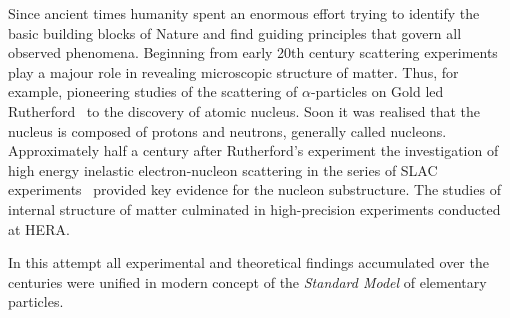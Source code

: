 Since ancient times humanity spent an enormous effort trying to identify the basic building blocks of Nature and find guiding principles that govern all observed phenomena. Beginning from early 20th century scattering experiments play a majour role in revealing microscopic structure of matter. Thus, for example, pioneering studies of the scattering of $\alpha$-particles on Gold led Rutherford~\cite{rutherford} to the discovery of atomic nucleus. Soon it was realised that the nucleus is composed of protons and neutrons, generally called nucleons. Approximately half a century after Rutherford's experiment the investigation of high energy inelastic electron-nucleon scattering in  the  series of SLAC experiments~\cite{slac} provided key evidence for the nucleon substructure. The studies of internal structure of matter culminated in high-precision experiments conducted at HERA.

In this attempt all experimental and theoretical findings accumulated over the centuries were unified in modern concept of the \emph{Standard Model} of elementary particles.